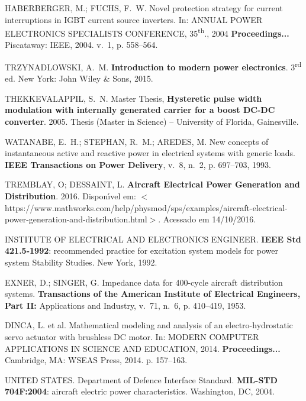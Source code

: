 \begin{thebibliography}{}
{HABERBERGER, M.; FUCHS, F.~W. Novel protection strategy for current
  interruptions in IGBT current source inverters. In: \uppercase{Annual 
  Power Electronics Specialists Conference,} 35\textsuperscript{th}., 2004 
  \textbf{Proceedings...} Piscataway: IEEE, 2004. v.~1, p. 558--564.}

{TRZYNADLOWSKI, A.~M. \textbf{Introduction to modern power electronics}.
	3\textsuperscript{rd} ed. New York: John Wiley \& Sons, 2015.}

{THEKKEVALAPPIL, S.~N.
Master Thesis, \textbf{Hysteretic pulse width modulation with internally
  generated carrier for a boost DC-DC converter}. 2005. Thesis (Master in Science) --
  University of Florida, Gainesville.}

{WATANABE, E.~H.; STEPHAN, R.~M.; AREDES, M. New concepts of instantaneous
  active and reactive power in electrical systems with generic loads.
\textbf{IEEE Transactions on Power Delivery}, v.~8, n.~2, p. 697--703,
  1993.}

{TREMBLAY, O; DESSAINT, L. \textbf{Aircraft Electrical Power Generation and
  Distribution}. 2016.
  Dispon{\'\i}vel em:
$<$https://www.mathworks.com/help/physmod/sps/examples/aircraft-electrical- power-generation-and-distribution.html$>$.}
  Acessado em 14/10/2016.


{INSTITUTE OF ELECTRICAL AND ELECTRONICS ENGINEER. \textbf{IEEE Std 421.5-1992}:
  recommended practice for excitation system models for power system
  Stability Studies. New York, 1992.}

{EXNER, D.; SINGER, G. Impedance data for 400-cycle aircraft distribution
  systems.
\textbf{Transactions of the American Institute of Electrical Engineers, Part II:}
  Applications and Industry, v.~71, n.~6, p. 410--419, 1953.}

{DINCA, L. et al. Mathematical modeling and analysis of an electro-hydrostatic
  servo actuator with brushless {DC} motor. In: \uppercase{Modern
  Computer Applications in Science and Education}, 2014. \textbf{Proceedings...} Cambridge, MA: WSEAS
  Press, 2014. p. 157--163.}

{UNITED STATES. Department of Defence Interface Standard. \textbf{MIL-STD 704F:2004}: aircraft
  electric power characteristics. Washington, DC, 2004.}

\end{thebibliography}
